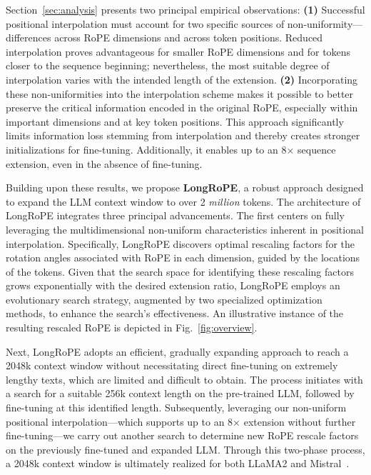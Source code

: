 Section~\ref{sec:analysis} presents two principal empirical observations: \textbf{(1)} Successful positional interpolation must account for two specific sources of non-uniformity—differences across RoPE dimensions and across token positions. Reduced interpolation proves advantageous for smaller RoPE dimensions and for tokens closer to the sequence beginning; nevertheless, the most suitable degree of interpolation varies with the intended length of the extension.
\textbf{(2)} Incorporating these non-uniformities into the interpolation scheme makes it possible to better preserve the critical information encoded in the original RoPE, especially within important dimensions and at key token positions. This approach significantly limits information loss stemming from interpolation and thereby creates stronger initializations for fine-tuning. Additionally, it enables up to an 8$\times$ sequence extension, even in the absence of fine-tuning.

Building upon these results, we propose \textbf{LongRoPE}, a robust approach designed to expand the LLM context window to over 2 \emph{million} tokens. The architecture of LongRoPE integrates three principal advancements. The first centers on fully leveraging the multidimensional non-uniform characteristics inherent in positional interpolation. Specifically, LongRoPE discovers optimal rescaling factors for the rotation angles associated with RoPE in each dimension, guided by the locations of the tokens. Given that the search space for identifying these rescaling factors grows exponentially with the desired extension ratio, LongRoPE employs an evolutionary search strategy, augmented by two specialized optimization methods, to enhance the search's effectiveness. An illustrative instance of the resulting rescaled RoPE is depicted in Fig.~\ref{fig:overview}.

Next, {LongRoPE} adopts an efficient, gradually expanding approach to reach a 2048k context window without necessitating direct fine-tuning on extremely lengthy texts, which are limited and difficult to obtain. The process initiates with a search for a suitable 256k context length on the pre-trained LLM, followed by fine-tuning at this identified length. Subsequently, leveraging our non-uniform positional interpolation—which supports up to an 8$\times$ extension without further fine-tuning—we carry out another search to determine new RoPE rescale factors on the previously fine-tuned and expanded LLM. Through this two-phase process, a 2048k context window is ultimately realized for both LLaMA2 and Mistral~\cite{mistral}.

